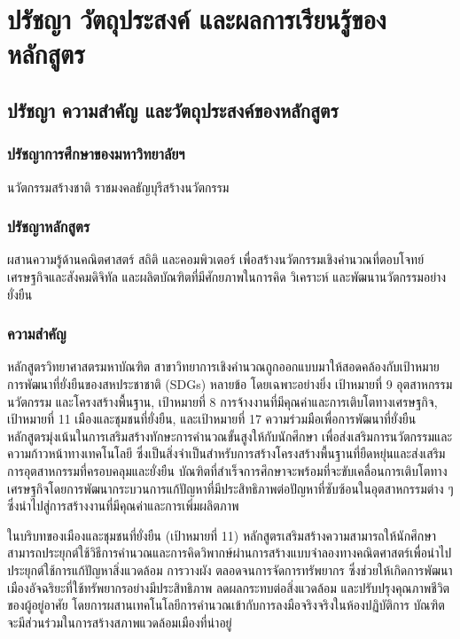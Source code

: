 \chapter{ปรัชญา วัตถุประสงค์ และผลการเรียนรู้ของหลักสูตร}

\section{ปรัชญา ความสำคัญ และวัตถุประสงค์ของหลักสูตร}

\subsection{ปรัชญาการศึกษาของมหาวิทยาลัยฯ}

นวัตกรรมสร้างชาติ ราชมงคลธัญบุรีสร้างนวัตกรรม

\subsection{ปรัชญาหลักสูตร}

ผสานความรู้ด้านคณิตศาสตร์ สถิติ และคอมพิวเตอร์ เพื่อสร้างนวัตกรรมเชิงคำนวณที่ตอบโจทย์เศรษฐกิจและสังคมดิจิทัล และผลิตบัณฑิตที่มีศักยภาพในการคิด วิเคราะห์ และพัฒนานวัตกรรมอย่างยั่งยืน

\subsection{ความสำคัญ} 

หลักสูตรวิทยาศาสตรมหาบัณฑิต สาขาวิทยาการเชิงคำนวณถูกออกแบบมาให้สอดคล้องกับเป้าหมายการพัฒนาที่ยั่งยืนของสหประชาชาติ (SDGs) หลายข้อ โดยเฉพาะอย่างยิ่ง เป้าหมายที่ 9 อุตสาหกรรม นวัตกรรม และโครงสร้างพื้นฐาน, เป้าหมายที่ 8 การจ้างงานที่มีคุณค่าและการเติบโตทางเศรษฐกิจ, เป้าหมายที่ 11 เมืองและชุมชนที่ยั่งยืน, และเป้าหมายที่ 17 ความร่วมมือเพื่อการพัฒนาที่ยั่งยืน หลักสูตรมุ่งเน้นในการเสริมสร้างทักษะการคำนวณขั้นสูงให้กับนักศึกษา เพื่อส่งเสริมการนวัตกรรมและความก้าวหน้าทางเทคโนโลยี ซึ่งเป็นสิ่งจำเป็นสำหรับการสร้างโครงสร้างพื้นฐานที่ยืดหยุ่นและส่งเสริมการอุตสาหกรรมที่ครอบคลุมและยั่งยืน บัณฑิตที่สำเร็จการศึกษาจะพร้อมที่จะขับเคลื่อนการเติบโตทางเศรษฐกิจโดยการพัฒนากระบวนการแก้ปัญหาที่มีประสิทธิภาพต่อปัญหาที่ซับซ้อนในอุตสาหกรรมต่าง ๆ ซึ่งนำไปสู่การสร้างงานที่มีคุณค่าและการเพิ่มผลิตภาพ

ในบริบทของเมืองและชุมชนที่ยั่งยืน (เป้าหมายที่ 11) หลักสูตรเสริมสร้างความสามารถให้นักศึกษาสามารถประยุกต์ใช้วิธีการคำนวณและการคิดวิพากษ์ผ่านการสร้างแบบจำลองทางคณิตศาสตร์เพื่อนำไปประยุกต์ใช้การแก้ปัญหาสิ่งแวดล้อม การวางผัง ตลอดจนการจัดการทรัพยากร ซึ่งช่วยให้เกิดการพัฒนาเมืองอัจฉริยะที่ใช้ทรัพยากรอย่างมีประสิทธิภาพ ลดผลกระทบต่อสิ่งแวดล้อม และปรับปรุงคุณภาพชีวิตของผู้อยู่อาศัย โดยการผสานเทคโนโลยีการคำนวณเข้ากับการลงมือจริงจริงในห้องปฏิบัติการ บัณฑิตจะมีส่วนร่วมในการสร้างสภาพแวดล้อมเมืองที่น่าอยู่

